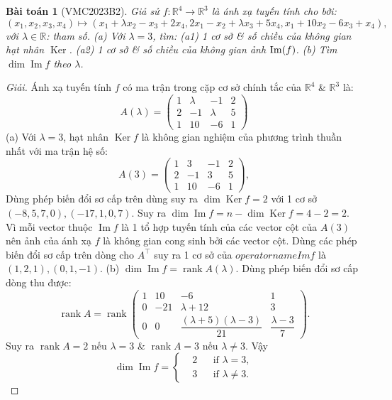 \documentclass{article}
\newtheorem{baitoan}{Bài toán}
\begin{document}
\begin{baitoan}[VMC2023B2]
	Giả sử $f:\mathbb{R}^4\to\mathbb{R}^3$ là ánh xạ tuyến tính cho bởi:
	\begin{equation*}
		(x_1,x_2,x_3,x_4)\mapsto(x_1 + \lambda x_2 - x_3 + 2x_4,2x_1 - x_2 + \lambda x_3 + 5x_4,x_1 + 10x_2 - 6x_3 + x_4),
	\end{equation*}
	với $\lambda\in\mathbb{R}$: tham số. (a) Với $\lambda = 3$, tìm: (a1) 1 cơ sở \& số chiều của không gian hạt nhân $\operatorname{Ker}$. (a2) 1 cơ sở \& số chiều của không gian ảnh ${\rm Im}(f)$. (b) Tìm $\dim\operatorname{Im}f$ theo $\lambda$.
\end{baitoan}

\begin{proof}[Giải]
	Ánh xạ tuyến tính $f$ có ma trận trong cặp cơ sở chính tắc của $\mathbb{R}^4$ \& $\mathbb{R}^3$ là:
	\begin{equation*}
		A(\lambda) = \begin{pmatrix}
			1 & \lambda & -1 & 2\\2 & -1 & \lambda & 5\\1 & 10 & -6 & 1
		\end{pmatrix}
	\end{equation*}
	(a) Với $\lambda = 3$, hạt nhân $\operatorname{Ker}f$ là không gian nghiệm của phương trình thuần nhất với ma trận hệ số:
	\begin{equation*}
		A(3) = \begin{pmatrix}
			1 & 3 & -1 & 2\\2 & -1 & 3 & 5\\1 & 10 & -6 & 1
		\end{pmatrix},
	\end{equation*}
	Dùng phép biến đổi sơ cấp trên dùng suy ra $\dim\operatorname{Ker}f = 2$ với 1 cơ sở $(-8,5,7,0),(-17,1,0,7)$. Suy ra $\dim\operatorname{Im}f = n - \dim\operatorname{Ker}f = 4 - 2 = 2$. Vì mỗi vector thuộc $\operatorname{Im}f$ là 1 tổ hợp tuyến tính của các vector cột của $A(3)$ nên ảnh của ánh xạ $f$ là không gian cong sinh bởi các vector cột. Dùng các phép biến đổi sơ cấp trên dòng cho $A^\top$ suy ra 1 cơ sở của $operatorname{Im}f$ là $(1,2,1),(0,1,-1)$. (b) $ \dim\operatorname{Im}f = \operatorname{rank}A(\lambda)$. Dùng phép biến đổi sơ cấp dòng thu được:
	\begin{equation*}
		\operatorname{rank}A = \operatorname{rank}\begin{pmatrix}
			1 & 10 & -6 & 1\\0 & -21 & \lambda + 12 & 3\\0 & 0 & \dfrac{(\lambda + 5)(\lambda - 3)}{21} & \dfrac{\lambda - 3}{7}
		\end{pmatrix}.
	\end{equation*}
	Suy ra $\operatorname{rank}A = 2$ nếu $\lambda = 3$ \& $\operatorname{rank}A = 3$ nếu $\lambda\ne3$. Vậy
	\begin{equation*}
		\dim\operatorname{Im}f = \left\{\begin{split}
			&2&&\mbox{if }\lambda = 3,\\
			&3&&\mbox{if }\lambda\ne3.
		\end{split}\right.
	\end{equation*}
\end{proof}
\end{document}
